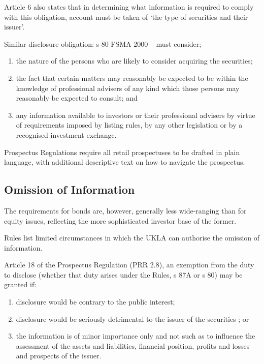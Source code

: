 \documentclass[
]{article}
\providecommand{\tightlist}{%
  \setlength{\itemsep}{0pt}\setlength{\parskip}{0pt}}
\begin{document}
Article 6 also states that in determining what information is required
to comply with this obligation, account must be taken of `the type of
securities and their issuer'.

Similar disclosure obligation: s 80 FSMA 2000 -- must consider;

\begin{enumerate}
\tightlist
\item
  the nature of the persons who are likely to consider acquiring the
  securities;
\item
  the fact that certain matters may reasonably be expected to be within
  the knowledge of professional advisers of any kind which those persons
  may reasonably be expected to consult; and
\item
  any information available to investors or their professional advisers
  by virtue of requirements imposed by listing rules, by any other
  legislation or by a recognised investment exchange.
\end{enumerate}

Prospectus Regulations require all retail prospectuses to be drafted in
plain language, with additional descriptive text on how to navigate the
prospectus.

\hypertarget{omission-of-information}{%
\subsection{Omission of Information}\label{omission-of-information}}

The requirements for bonds are, however, generally less wide-ranging
than for equity issues, reflecting the more sophisticated investor base
of the former.

Rules list limited circumstances in which the UKLA can authorise the
omission of information.

Article 18 of the Prospectus Regulation (PRR 2.8), an exemption from the
duty to disclose (whether that duty arises under the Rules, s 87A or s
80) may be granted if:

\begin{enumerate}
\tightlist
\item
  disclosure would be contrary to the public interest;
\item
  disclosure would be seriously detrimental to the issuer of the
  securities ; or
\item
  the information is of minor importance only and not such as to
  influence the assessment of the assets and liabilities, financial
  position, profits and losses and prospects of the issuer.
\end{enumerate}
\end{document}

